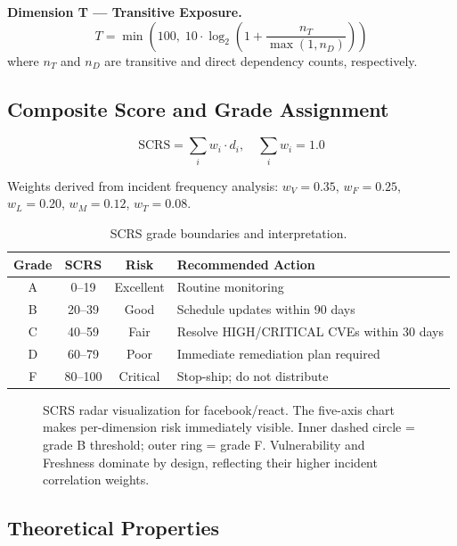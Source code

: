 \documentclass[11pt,twocolumn]{article}
\begin{document}
\noindent\textbf{Dimension T --- Transitive Exposure.}
\begin{equation}
T = \min\!\left(100,\; 10 \cdot \log_2\!\left(1 + \frac{n_T}{\max(1,n_D)}\right)\right)
\end{equation}
where $n_T$ and $n_D$ are transitive and direct dependency counts, respectively.

\subsection{Composite Score and Grade Assignment}

\begin{equation}
\mathrm{SCRS} = \sum_{i} w_i \cdot d_i, \quad \sum_i w_i = 1.0
\end{equation}

Weights derived from incident frequency analysis: $w_V = 0.35$, $w_F = 0.25$,
$w_L = 0.20$, $w_M = 0.12$, $w_T = 0.08$.

\begin{table}[H]
\centering
\small
\caption{SCRS grade boundaries and interpretation.}
\begin{tabularx}{\columnwidth}{c c c X}
\toprule
\textbf{Grade} & \textbf{SCRS} & \textbf{Risk} & \textbf{Recommended Action} \\
\midrule
A & 0--19   & Excellent & Routine monitoring \\
B & 20--39  & Good      & Schedule updates within 90 days \\
C & 40--59  & Fair      & Resolve HIGH/CRITICAL CVEs within 30 days \\
D & 60--79  & Poor      & Immediate remediation plan required \\
F & 80--100 & Critical  & Stop-ship; do not distribute \\
\bottomrule
\end{tabularx}
\end{table}

\begin{figure}[H]
  \centering
  
  \caption{SCRS radar visualization for facebook/react. The five-axis chart
  makes per-dimension risk immediately visible. Inner dashed circle = grade B
  threshold; outer ring = grade F. Vulnerability and Freshness dominate by
  design, reflecting their higher incident correlation weights.}
  \label{fig:radar}
\end{figure}

\subsection{Theoretical Properties}
\end{document}
